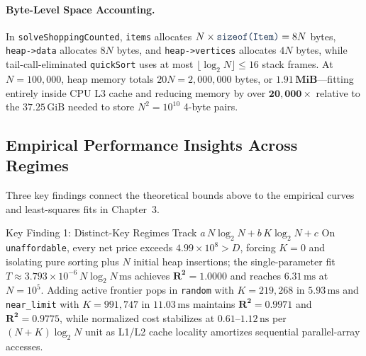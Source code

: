 \documentclass[10pt, a4paper]{article}
\newcommand{\code}[1]{\texttt{\color{primary!90!black}#1}}
\begin{document}
\paragraph{Byte-Level Space Accounting.}
In \code{solveShoppingCounted}, \code{items} allocates $N \times \code{sizeof(Item)} = 8N$ bytes, \code{heap->data} allocates $8N$ bytes, and \code{heap->vertices} allocates $4N$ bytes, while tail-call-eliminated \code{quickSort} uses at most $\lfloor \log_2 N \rfloor \le 16$ stack frames. At $N = 100{,}000$, heap memory totals $20N = 2{,}000{,}000$ bytes, or $\mathbf{1.91\,\text{MiB}}$---fitting entirely inside CPU L3 cache and reducing memory by over $\mathbf{20{,}000\times}$ relative to the $37.25\,\text{GiB}$ needed to store $N^2 = 10^{10}$ 4-byte pairs.

\subsection{Empirical Performance Insights Across Regimes}
Three key findings connect the theoretical bounds above to the empirical curves and least-squares fits in Chapter~3.

\vspace{-0.2em}
\begin{insightbox}{Key Finding 1: Distinct-Key Regimes Track $a\,N\log_2 N + b\,K\log_2 N + c$}
On \code{unaffordable}, every net price exceeds $4.99 \times 10^8 > D$, forcing $K = 0$ and isolating pure sorting plus $N$ initial heap insertions; the single-parameter fit $T \approx 3.793 \times 10^{-6}\,N\log_2 N\,\text{ms}$ achieves $\mathbf{R^2 = 1.0000}$ and reaches $6.31\,\text{ms}$ at $N = 10^5$. Adding active frontier pops in \code{random} with $K = 219{,}268$ in $5.93\,\text{ms}$ and \code{near\_limit} with $K = 991{,}747$ in $11.03\,\text{ms}$ maintains $\mathbf{R^2 = 0.9971}$ and $\mathbf{R^2 = 0.9775}$, while normalized cost stabilizes at $0.61$--$1.12\,\text{ns}$ per $(N + K)\log_2 N$ unit as L1/L2 cache locality amortizes sequential parallel-array accesses.
\end{insightbox}
\vspace{-0.3em}
\end{document}
